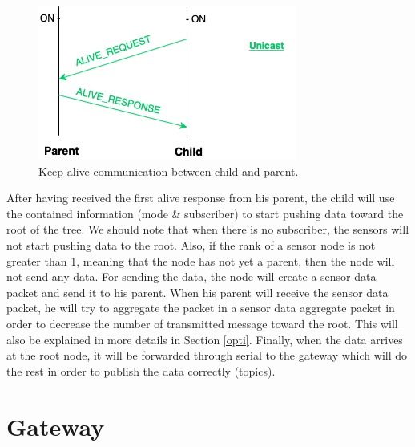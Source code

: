 \documentclass[a4paper,10pt]{article}
\begin{document}
\begin{figure}
\centering
\includegraphics[scale=0.6]{./img/alive.png}
\caption{Keep alive communication between child and parent.}
\label{fig:alive}
\end{figure}

After having received the first alive response from his parent, the child will use the contained information (mode \& subscriber) to start pushing data toward the root of the tree. We should note that when there is no subscriber, the sensors will not start pushing data to the root. Also, if the rank of a sensor node is not greater than 1,  meaning that the node has not yet a parent, then the node will not send any data. For sending the data, the node will create a sensor data packet and send it to his parent. When his parent will receive the sensor data packet, he will try to aggregate the packet in a sensor data aggregate packet in order to decrease the number of transmitted message toward the root. This will also be explained in more details in Section \ref{opti}. Finally, when the data arrives at the root node, it will be forwarded through serial to the gateway which will do the rest in order to publish the data correctly (topics).

\section{Gateway}
\label{gateway}
\end{document}

